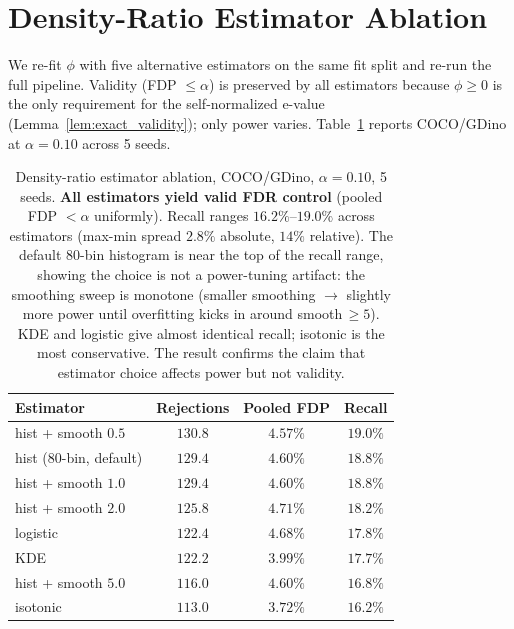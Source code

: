 \documentclass{article}
\theoremstyle{remark}
\newcommand{\1}{\mathbf{1}}
\begin{document}
\section{Density-Ratio Estimator Ablation}
\label{app:estimator_ablation}

We re-fit $\phi$ with five alternative estimators on the same fit
split and re-run the full pipeline. Validity (FDP $\le\alpha$) is
preserved by all estimators because $\phi\!\ge\!0$ is the only
requirement for the self-normalized e-value
(Lemma~\ref{lem:exact_validity}); only power varies.
Table~\ref{tab:estimator_ablation} reports COCO/GDino at
$\alpha\!=\!0.10$ across 5 seeds.

\begin{table}[h]
\centering
\small
\begin{tabular*}{\linewidth}{@{\extracolsep{\fill}}lccc@{}}
\toprule
Estimator & Rejections & Pooled FDP & Recall \\
\midrule
hist + smooth $0.5$           & $130.8$ & $4.57\%$ & $19.0\%$ \\
hist (80-bin, default)        & $129.4$ & $4.60\%$ & $18.8\%$ \\
hist + smooth $1.0$           & $129.4$ & $4.60\%$ & $18.8\%$ \\
hist + smooth $2.0$           & $125.8$ & $4.71\%$ & $18.2\%$ \\
logistic                      & $122.4$ & $4.68\%$ & $17.8\%$ \\
KDE                           & $122.2$ & $3.99\%$ & $17.7\%$ \\
hist + smooth $5.0$           & $116.0$ & $4.60\%$ & $16.8\%$ \\
isotonic                      & $113.0$ & $3.72\%$ & $16.2\%$ \\
\bottomrule
\end{tabular*}
\caption{Density-ratio estimator ablation, COCO/GDino,
$\alpha\!=\!0.10$, 5 seeds.
\textbf{All estimators yield valid FDR control}
(pooled FDP $<\alpha$ uniformly). Recall ranges $16.2\%$--$19.0\%$
across estimators (max-min spread $2.8\%$ absolute, $14\%$ relative).
The default 80-bin histogram is near the top of the recall range,
showing the choice is not a power-tuning artifact: the smoothing
sweep is monotone (smaller smoothing $\to$ slightly more power until
overfitting kicks in around smooth$\,\ge\!5$). KDE and logistic give
almost identical recall; isotonic is the most conservative.
The result confirms the claim that estimator choice affects power
but not validity.}
\label{tab:estimator_ablation}
\end{table}
\end{document}

